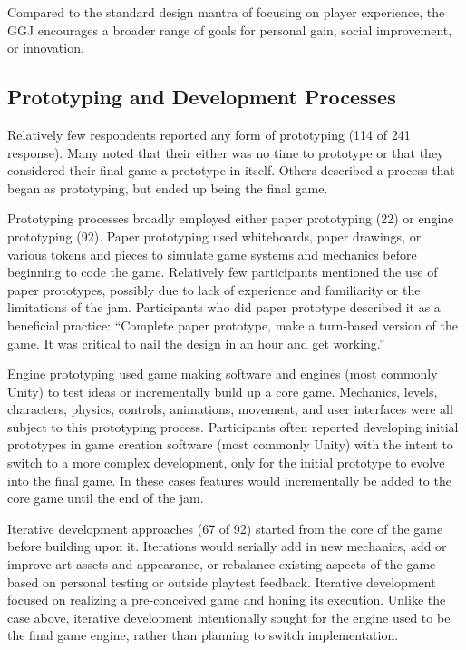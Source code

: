 \documentclass{sig-alternate}
\begin{document}
Compared to the standard design mantra of focusing on player experience, the GGJ encourages a broader range of goals for personal gain, social improvement, or innovation. 


\subsection{Prototyping and Development Processes}
Relatively few respondents reported any form of prototyping (114 of 241 response). Many noted that their either was no time to prototype or that they considered their final game a prototype in itself. Others described a process that began as prototyping, but ended up being the final game.

Prototyping processes broadly employed either paper prototyping (22) or engine prototyping (92).
Paper prototyping used whiteboards, paper drawings, or various tokens and pieces to simulate game systems and mechanics before beginning to code the game. Relatively few participants mentioned the use of paper prototypes, possibly due to lack of experience and familiarity or the limitations of the jam. Participants who did paper prototype described it as a beneficial practice:
``Complete paper prototype, make a turn-based version of the game. It was critical to nail the design in an hour and get working.''

Engine prototyping used game making software and engines (most commonly Unity) to test ideas or incrementally build up a core game. Mechanics, levels, characters, physics, controls, animations, movement, and user interfaces were all subject to this prototyping process. 
Participants often reported developing initial prototypes in game creation software (most commonly Unity) with the intent to switch to a more complex development, only for the initial prototype to evolve into the final game. In these cases features would incrementally be added to the core game until the end of the jam.

Iterative development approaches (67 of 92) started from the core of the game before building upon it. Iterations would serially add in new mechanics, add or improve art assets and appearance, or rebalance existing aspects of the game based on personal testing or outside playtest feedback.
Iterative development focused on realizing a pre-conceived game and honing its execution.
Unlike the case above, iterative development intentionally sought for the engine used to be the final game engine, rather than planning to switch implementation.
\end{document}
